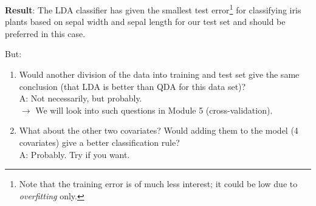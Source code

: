 \documentclass[10pt,ignorenonframetext,]{beamer}
\providecommand{\tightlist}{%
  \setlength{\itemsep}{0pt}\setlength{\parskip}{0pt}}
\begin{document}
\begin{frame}

\textbf{Result}: The LDA classifier has given the smallest test
error\footnote{Note that the training error is of much less interest; it could be low due to \emph{overfitting} only.}
for classifying iris plants based on sepal width and sepal length for
our test set and should be preferred in this case.

\vspace{2mm}

But:

\begin{enumerate}
\tightlist
\item
  Would another division of the data into training and test set give the
  same conclusion (that LDA is better than QDA for this data set)?\\
  A: Not necessarily, but probably.\\
  \(\rightarrow\) We will look into such questions in Module 5
  (cross-validation).
\end{enumerate}

\vspace{2mm}

\begin{enumerate}
\setcounter{enumi}{1}
\tightlist
\item
  What about the other two covariates? Would adding them to the model (4
  covariates) give a better classification rule?\\
  A: Probably. Try if you want.
\end{enumerate}

\end{frame}
\end{document}
